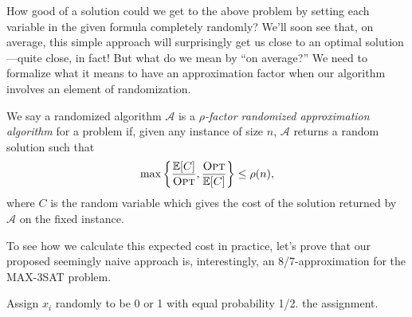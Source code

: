 \documentclass{article}
\newenvironment{definition}[2][Definition]{\begin{trivlist}
\item[\hskip \labelsep {\bfseries #1}\hskip \labelsep {\hspace{-1ex}\bfseries #2.}]}{\end{trivlist}}
\begin{document}
\noindent How good of a solution could we get to the above problem by setting each variable in the given formula completely randomly? We'll soon see that, on average, this simple approach will surprisingly get us close to an optimal solution---quite close, in fact! But what do we mean by ``on average?'' We need to formalize what it means to have an approximation factor when our algorithm involves an element of randomization.
\begin{definition}{ (Randomized Approximation Algorithm)}{}
    We say a randomized algorithm $\mathcal{A}$ is a \textit{$\rho$-factor randomized approximation algorithm} for a problem if, given any instance of size $n$, $\mathcal{A}$ returns a random solution such that
    \[
    \max \bigg\{ \frac{\mathbb{E}[C]}{\textsc{Opt}}, \frac{\textsc{Opt}}{\mathbb{E}[C]} \bigg\} \leq \rho(n),
    \]
    where $C$ is the random variable which gives the cost of the solution returned by $\mathcal{A}$ on the fixed instance.
\end{definition}

\noindent To see how we calculate this expected cost in practice, let's prove that our proposed seemingly naive approach is, interestingly, an 8/7-approximation for the MAX-3SAT problem.

\begin{algorithm}
    \renewcommand{\thealgorithm}{}
    \caption{\textsc{Approx-MAX-3SAT}$(\phi)$}
    \begin{algorithmic}[1]
            \State Assign $x_i$ randomly to be 0 or 1 with equal probability 1/2.
        \EndFor
        \State \Return the assignment.
    \end{algorithmic}
\end{algorithm}
\end{document}
